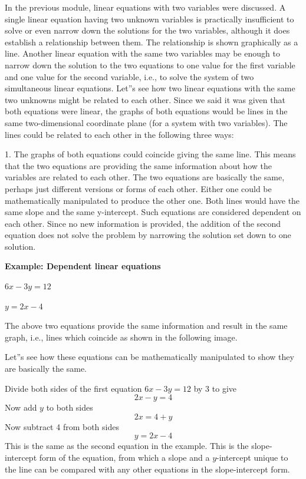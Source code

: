 In the previous module, linear equations with two variables were discussed. A single linear equation having two unknown variables is practically insufficient to solve or even narrow down the solutions for the two variables, although it does establish a relationship between them. The relationship is shown graphically as a line. Another linear equation with the same two variables may be enough to narrow down the solution to the two equations to one value for the first variable and one value for the second variable, i.e., to solve the system of two simultaneous linear equations. Let''s see how two linear equations with the same two unknowns might be related to each other. Since we said it was given that both equations were linear, the graphs of both equations would be lines in the same two-dimensional coordinate plane (for a system with two variables). The lines could be related to each other in the following three ways:

1. The graphs of both equations could coincide giving the same line. This means that the two equations are providing the same information about how the variables are related to each other. The two equations are basically the same, perhaps just different versions or forms of each other. Either one could be mathematically manipulated to produce the other one. Both lines would have the same slope and the same y-intercept. Such equations are considered dependent on each other. Since no new information is provided, the addition of the second equation does not solve the problem by narrowing the solution set down to one solution.

   \textbf{Example: Dependent linear equations}

   $6x - 3y = 12$

   $y = 2x - 4$

   The above two equations provide the same information and result in the same graph, i.e., lines which coincide as shown in the following image.


Let''s see how these equations can be mathematically manipulated to show they are basically the same.

Divide both sides of the first equation $6x - 3y = 12$ by 3 to give
$$
2x - y = 4
$$
Now add $y$ to both sides
$$
2x = 4 + y
$$
Now subtract 4 from both sides
$$
y = 2x - 4
$$
This is the same as the second equation in the example. This is the slope-intercept form of the equation, from which a slope and a $y$-intercept unique to the line can be compared with any other equations in the slope-intercept form.

